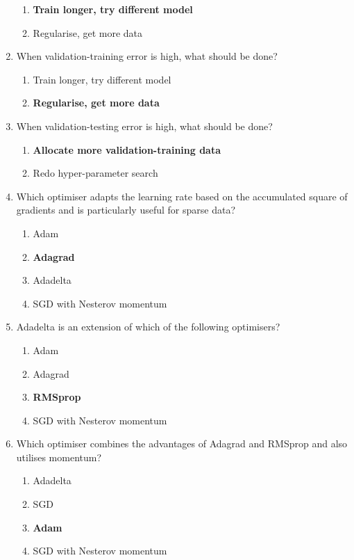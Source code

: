 \documentclass{report}
\numberwithin{equation}{section}
\begin{document}
\begin{enumerate}
    \begin{enumerate}[label=\alph*.]
        \item \textbf{Train longer, try different model}
        \item Regularise, get more data
    \end{enumerate}
    \item When validation-training error is high, what should be done?
    \begin{enumerate}[label=\alph*.]
        \item Train longer, try different model
        \item \textbf{Regularise, get more data}
    \end{enumerate}
    \item When validation-testing error is high, what should be done?
    \begin{enumerate}[label=\alph*.]
        \item \textbf{Allocate more validation-training data}
        \item Redo hyper-parameter search
    \end{enumerate}
\item Which optimiser adapts the learning rate based on the accumulated square of gradients and is particularly useful for sparse data?
\begin{enumerate}[label=\alph*.]
    \item Adam
    \item \textbf{Adagrad}
    \item Adadelta
    \item SGD with Nesterov momentum
\end{enumerate}

\item Adadelta is an extension of which of the following optimisers?
\begin{enumerate}[label=\alph*.]
    \item Adam
    \item Adagrad
    \item \textbf{RMSprop}
    \item SGD with Nesterov momentum
\end{enumerate}

\item Which optimiser combines the advantages of Adagrad and RMSprop and also utilises momentum?
\begin{enumerate}[label=\alph*.]
    \item Adadelta
    \item SGD
    \item \textbf{Adam}
    \item SGD with Nesterov momentum
\end{enumerate}


\end{enumerate}
\end{document}
